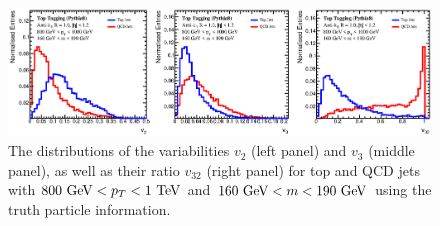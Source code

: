 \documentclass[aps,prl,floatfix,preprintnumbers,twocolumn,groupedaddress,nofootinbib]{revtex4-1}
\begin{document}
\begin{figure}
    \includegraphics[width=2\columnwidth]{plots/Top_vs_high.eps}
    \caption{The distributions of the variabilities $v_2$ (left panel) and $v_3$ (middle panel), as well as their ratio $v_{32}$ (right panel) for top and QCD jets with $800~{\rm GeV} < p_T < 1~{\rm TeV}$ and $160~{\rm GeV} < m < 190~{\rm GeV}$ using the truth particle information.}
\label{v32}
\end{figure}
\end{document}
